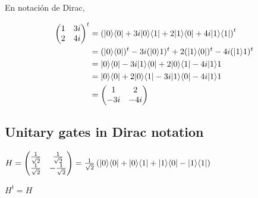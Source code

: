 \documentclass[osajnl,preprint,showpacs,superscriptaddress,10pt]{revtex4-1} %
\DeclarePairedDelimiter\bra{\langle}{\rvert}
\DeclarePairedDelimiter\ket{\lvert}{\rangle}
\begin{document}
\begin{itemize}
    En notación de Dirac,
    \begin{fleqn}[\parindent]
    \begin{equation}
    \begin{split}
        \begin{pmatrix}1 & 3i \\ 2 & 4i\end{pmatrix}^t
            &= \left (\ket{0}\bra{0} + 3i\ket{0}\bra{1} + 2\ket{1}\bra{0} + 4i\ket{1}\bra{1} \right)^t \\
            &=  (\ket{0}\bra{0})^t - 3i(\ket{0}{1})^t + 2(\ket{1}\bra{0})^t -4i(\ket{1}{1})^t \\
            &=  \ket{0}\bra{0} - 3i\ket{1}\bra{0} + 2\ket{0}\bra{1} - 4i\ket{1}{1} \\
            &=  \ket{0}\bra{0} + 2\ket{0}\bra{1} - 3i\ket{1}\bra{0} - 4i\ket{1}{1} \\
            &= \begin{pmatrix}1 & 2 \\ -3i & -4i\end{pmatrix}
    \end{split}
    \end{equation}
    \end{fleqn}
\end{itemize}

\subsection{Unitary gates in Dirac notation}

$H = \begin{pmatrix}\frac{1}{\sqrt{2}} & \frac{1}{\sqrt{2}} \\ \frac{1}{\sqrt{2}} & -\frac{1}{\sqrt{2}}\end{pmatrix} = \frac{1}{\sqrt{2}} \left (\ket{0}\bra{0} + \ket{0}\bra{1} + \ket{1}\bra{0} -\ket{1}\bra{1} \right)$

$H^t = H$
\end{document}
